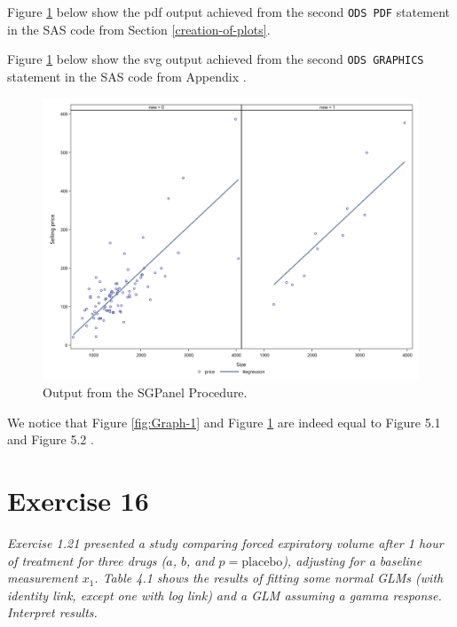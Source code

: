 \documentclass[a4paper,oneside]{memoir}
\begin{document}
Figure \ref{fig:Graph-2} below show the pdf output achieved from the second \texttt{ODS\ PDF} statement in the SAS code from Section \ref{creation-of-plots}.

Figure \ref{fig:Graph-2} below show the svg output achieved from the second \texttt{ODS\ GRAPHICS} statement in the SAS code from Appendix .

\newpage

\begin{figure}[htbp!]

{\centering \includegraphics[width=1\linewidth]{graphs/EX13_G2} 

}

\caption{Output from the SGPanel Procedure.}\label{fig:Graph-2}
\end{figure}

\newpage

We notice that Figure \ref{fig:Graph-1} and Figure \ref{fig:Graph-2} are indeed equal to Figure 5.1 and Figure 5.2 \citep{Pedersen2019}.

\newpage

\hypertarget{exercise-16}{%
\chapter{Exercise 16}\label{exercise-16}}

\emph{Exercise 1.21 \citep{Agresti2015} presented a study comparing forced expiratory volume after 1 hour of treatment for three drugs (\(a\), \(b\), and \(p = \text{placebo}\)), adjusting for a baseline measurement \(x_1\). Table 4.1 \citep{Agresti2015} shows the results of fitting some normal GLMs (with identity link, except one with log link) and a GLM assuming a gamma response. Interpret results.}
\end{document}
